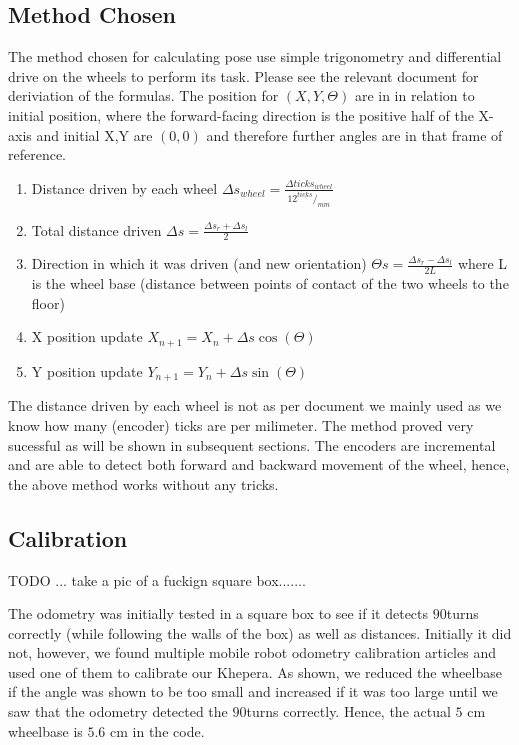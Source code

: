 \documentclass[11pt, a4paper]{article}
\begin{document}
\subsection{Method Chosen}

The method chosen for calculating pose\cite{odo_used} use simple trigonometry and differential drive on 
the wheels to perform its task. Please see the relevant document for deriviation of the formulas. The position for 
${(X,Y,\Theta)}$ are in in relation to initial position, where the forward-facing direction is the positive half of the
X-axis and initial X,Y are ${(0,0)}$ and therefore further angles are in that frame of reference.

\begin{enumerate}

	\item Distance driven by each wheel $\Delta s_{wheel} = \frac {\Delta ticks_{wheel} } {12 ^{ticks}/_{mm}} $
	\item Total distance driven $ \Delta s = \frac{\Delta s_{r} + \Delta s_{l} }{2}$
	\item Direction in which it was driven (and new orientation) $\Theta s = \frac{ \Delta s_{r} - \Delta s_{l} }{2L}$ where L is the wheel base 
	(distance between points of contact of the two wheels to the floor)
	\item X position update $X_{n+1} = X_{n} + \Delta s \cos (\Theta)$
	\item Y position update $Y_{n+1} = Y_{n} + \Delta s \sin (\Theta)$


\end{enumerate}


The distance driven by each wheel is not as per document we mainly used as we know 
how many (encoder) ticks are per milimeter. The method proved very sucessful as 
will be shown in subsequent sections. The encoders are incremental and are able to 
detect both forward and backward movement of the wheel, hence, the above method works 
without any tricks.

\subsection{Calibration}

TODO ... take a pic of a fuckign square box.......

The odometry was initially tested in a square box to see if it detects $90$\degree turns correctly 
(while following the walls of the box) as well as distances. Initially it did not, however, we 
found multiple mobile robot odometry calibration articles and used one of them\cite{odo_calibration}
 to calibrate our Khepera. As shown, we reduced the wheelbase if the angle was shown to be too small 
and increased if it was too large until we saw that the odometry detected the  $90$\degree turns correctly. 
Hence, the actual $5$ cm wheelbase is $5.6$ cm in the code.
\end{document}
